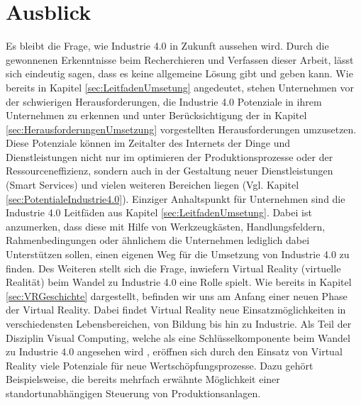 \section{Ausblick}\label{sec:Ausblick}
Es bleibt die Frage, wie Industrie 4.0 in Zukunft aussehen wird. Durch die gewonnenen Erkenntnisse beim Recherchieren und Verfassen dieser Arbeit, lässt sich eindeutig sagen, dass es keine allgemeine Lösung gibt und geben kann. Wie bereits in Kapitel \ref{sec:LeitfadenUmsetung} angedeutet, stehen Unternehmen vor der schwierigen Herausforderungen, die Industrie 4.0 Potenziale in ihrem Unternehmen zu erkennen und unter Berücksichtigung der in Kapitel \ref{sec:HerausforderungenUmsetzung} vorgestellten Herausforderungen umzusetzen. Diese Potenziale können im Zeitalter des Internets der Dinge und Dienstleistungen nicht nur im optimieren der Produktionsprozesse oder der Ressourceneffizienz, sondern auch in der Gestaltung neuer Dienstleistungen (Smart Services) und vielen weiteren Bereichen liegen (Vgl. Kapitel \ref{sec:PotentialeIndustrie4.0}). 
Einziger Anhaltspunkt für Unternehmen sind die Industrie 4.0 Leitfäden aus Kapitel \ref{sec:LeitfadenUmsetung}. Dabei ist anzumerken, dass diese mit Hilfe von Werkzeugkästen, Handlungsfeldern, Rahmenbedingungen oder ähnlichem die Unternehmen lediglich dabei Unterstützen sollen, einen eigenen Weg für die Umsetzung von Industrie 4.0 zu finden.
\newline\newline
Des Weiteren stellt sich die Frage, inwiefern Virtual Reality (virtuelle Realität) beim Wandel zu Industrie 4.0 eine Rolle spielt. Wie bereits in Kapitel \ref{sec:VRGeschichte} dargestellt, befinden wir uns am Anfang einer neuen Phase der Virtual Reality. Dabei findet Virtual Reality neue Einsatzmöglichkeiten in verschiedensten Lebensbereichen, von Bildung bis hin zu Industrie. Als Teil der Disziplin Visual Computing, welche als eine Schlüsselkomponente beim Wandel zu Industrie 4.0 angesehen wird \cite[S.1]{17}, eröffnen sich durch den Einsatz von Virtual Reality viele Potenziale für neue Wertschöpfungsprozesse. Dazu gehört Beispielsweise, die bereits mehrfach erwähnte Möglichkeit einer standortunabhängigen Steuerung von Produktionsanlagen.

